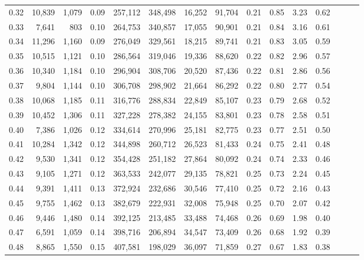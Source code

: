 \begin{tabular}{rrrrrrrrrrrrrrr}
0.32 &  10,839 &  1,079 &  0.09 &  257,112 &  348,498 &   16,252 &   91,704 &  0.21 &  0.85 &  3.23 &      0.62 \\
0.33 &   7,641 &    803 &  0.10 &  264,753 &  340,857 &   17,055 &   90,901 &  0.21 &  0.84 &  3.16 &      0.61 \\
0.34 &  11,296 &  1,160 &  0.09 &  276,049 &  329,561 &   18,215 &   89,741 &  0.21 &  0.83 &  3.05 &      0.59 \\
0.35 &  10,515 &  1,121 &  0.10 &  286,564 &  319,046 &   19,336 &   88,620 &  0.22 &  0.82 &  2.96 &      0.57 \\
0.36 &  10,340 &  1,184 &  0.10 &  296,904 &  308,706 &   20,520 &   87,436 &  0.22 &  0.81 &  2.86 &      0.56 \\
0.37 &   9,804 &  1,144 &  0.10 &  306,708 &  298,902 &   21,664 &   86,292 &  0.22 &  0.80 &  2.77 &      0.54 \\
0.38 &  10,068 &  1,185 &  0.11 &  316,776 &  288,834 &   22,849 &   85,107 &  0.23 &  0.79 &  2.68 &      0.52 \\
0.39 &  10,452 &  1,306 &  0.11 &  327,228 &  278,382 &   24,155 &   83,801 &  0.23 &  0.78 &  2.58 &      0.51 \\
0.40 &   7,386 &  1,026 &  0.12 &  334,614 &  270,996 &   25,181 &   82,775 &  0.23 &  0.77 &  2.51 &      0.50 \\
0.41 &  10,284 &  1,342 &  0.12 &  344,898 &  260,712 &   26,523 &   81,433 &  0.24 &  0.75 &  2.41 &      0.48 \\
0.42 &   9,530 &  1,341 &  0.12 &  354,428 &  251,182 &   27,864 &   80,092 &  0.24 &  0.74 &  2.33 &      0.46 \\
0.43 &   9,105 &  1,271 &  0.12 &  363,533 &  242,077 &   29,135 &   78,821 &  0.25 &  0.73 &  2.24 &      0.45 \\
0.44 &   9,391 &  1,411 &  0.13 &  372,924 &  232,686 &   30,546 &   77,410 &  0.25 &  0.72 &  2.16 &      0.43 \\
0.45 &   9,755 &  1,462 &  0.13 &  382,679 &  222,931 &   32,008 &   75,948 &  0.25 &  0.70 &  2.07 &      0.42 \\
0.46 &   9,446 &  1,480 &  0.14 &  392,125 &  213,485 &   33,488 &   74,468 &  0.26 &  0.69 &  1.98 &      0.40 \\
0.47 &   6,591 &  1,059 &  0.14 &  398,716 &  206,894 &   34,547 &   73,409 &  0.26 &  0.68 &  1.92 &      0.39 \\
0.48 &   8,865 &  1,550 &  0.15 &  407,581 &  198,029 &   36,097 &   71,859 &  0.27 &  0.67 &  1.83 &      0.38 \\

\end{tabular}
